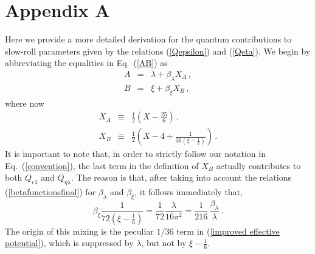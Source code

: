 \documentclass[aps,12pt,superscriptaddress,preprintnumbers,
                secnumarabic,nofootinbib,showpacs]{revtex4}
\begin{document}
\section*{Appendix A}
Here we provide a more detailed derivation for the quantum
contributions to slow-roll parameters given by the relations
(\ref{Qepsilon}) and (\ref{Qeta}). We begin by abbreviating
the equalities in Eq.~(\ref{AB}) as
\begin{eqnarray}
A &=& \lambda + \beta_{\lambda}X_A\,,\nonumber\\
B &=& \xi + \beta_{\xi}X_B\,,
\end{eqnarray}
where now
\begin{eqnarray}
X_A &\equiv& \frac12\left(X-\frac{25}{6}\right)\,,\nonumber\\
X_B &\equiv&
\frac12\left(X-4+\frac{1}{36\left(\xi-\frac16\right)}\right)\,.
\end{eqnarray}
It is important to note that, in order to strictly follow our
notation in Eq.~(\ref{convention}), the last term in the definition of
$X_B$ actually contributes to both $Q_{\epsilon\lambda}$ and
$Q_{\eta\lambda}$. The reason is that, after taking into account
the relations (\ref{betafunctionsfinal}) for $\beta_{\lambda}$ and
$\beta_{\xi}$, it follows immediately that,
\begin{equation}
\beta_{\xi}\frac{1}{72\left(\xi-\frac16\right)} =
\frac{1}{72}\frac{\lambda}{16\pi^2} =
\frac{1}{216}\,\frac{\beta_{\lambda}}{\lambda}\,.
\end{equation}
The origin of this mixing is the peculiar ${1}/{36}$ term in
(\ref{improved effective potential}), which is suppressed by
$\lambda$, but not by $\xi -\frac16$.
\end{document}

